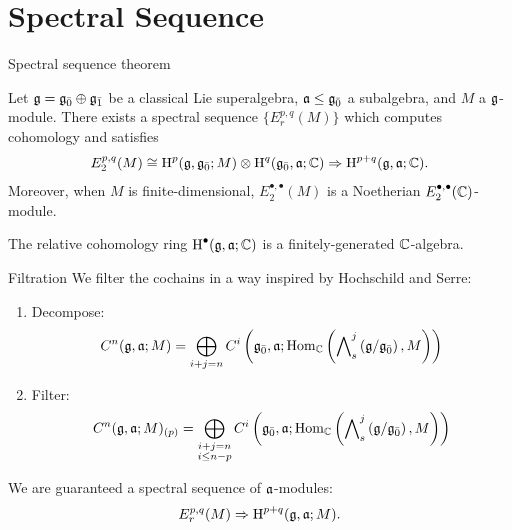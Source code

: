 \documentclass{beamer}
\begin{document}
\section{Spectral Sequence}

\begin{frame}{Spectral sequence theorem}\pause

  \begin{theorem}
    Let $\mathfrak{g} = {\mathfrak{g}}_{\bar{0}} \oplus {\mathfrak{g}}_{\bar{1}}$ be a classical Lie superalgebra, $\mathfrak{a} \leq {\mathfrak{g}}_{\bar{0}}$ a subalgebra, and $M$ a $\mathfrak{g}$-module. There exists a spectral sequence $\{E_r^{p,q}(M)\}$ which computes cohomology and satisfies
    \begin{align*}
      E_2^{p,q}(M) \cong \operatorname{H}^p(\mathfrak{g},{\mathfrak{g}}_{\bar{0}};M) \otimes \operatorname{H}^q({\mathfrak{g}}_{\bar{0}},\mathfrak{a};\mathbb{C}) \Rightarrow \operatorname{H}^{p+q}(\mathfrak{g},\mathfrak{a};\mathbb{C}).
    \end{align*}
    Moreover, when $M$ is finite-dimensional, $E_2^{\bullet,\bullet}(M)$ is a Noetherian $E_2^{\bullet,\bullet}(\mathbb{C})$-module.
  \end{theorem}
\pause
  \begin{corollary}
    The relative cohomology ring $\operatorname{H}^\bullet(\mathfrak{g},\mathfrak{a};\mathbb{C})$ is a finitely-generated $\mathbb{C}$-algebra.
  \end{corollary}
\end{frame}

\begin{frame}{Filtration}\pause
  We filter the cochains in a way inspired by Hochschild and Serre:\pause
  \begin{enumerate}
  \item Decompose:
    \[
      C^n(\mathfrak{g},\mathfrak{a};M) = \bigoplus_{i + j = n} C^i\left({\mathfrak{g}}_{\bar{0}},\mathfrak{a};\operatorname{Hom}_{\mathbb{C}}\left( \bigwedge\nolimits^{j}_s\left(\mathfrak{g}/{\mathfrak{g}}_{\bar{0}}\right),M\right)\right)
    \]\pause
  \item Filter:
    \[
      C^n(\mathfrak{g},\mathfrak{a};M)_{(p)} = \bigoplus_{\substack{i + j = n\\ i \leq n-p}} C^i\left({\mathfrak{g}}_{\bar{0}},\mathfrak{a};\operatorname{Hom}_{\mathbb{C}}\left( \bigwedge\nolimits^{j}_s\left(\mathfrak{g}/{\mathfrak{g}}_{\bar{0}}\right),M\right)\right)
    \]
    
  \end{enumerate}
\pause
  We are guaranteed a spectral sequence of $\mathfrak{a}$-modules:
  \[
    E_r^{p,q}(M) \Rightarrow \operatorname{H}^{p+q}(\mathfrak{g},\mathfrak{a};M).
  \]  
\end{frame}
\end{document}
